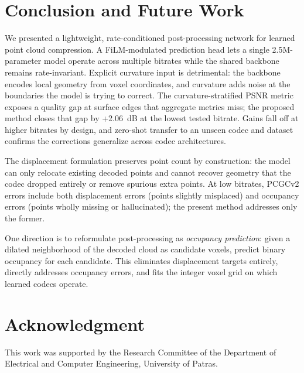\documentclass[conference]{IEEEtran}
\begin{document}
\section{Conclusion and Future Work}
\label{sec:conclusion}

We presented a lightweight, rate-conditioned post-processing network for
learned point cloud compression. A FiLM-modulated prediction head lets a
single 2.5M-parameter model operate across multiple bitrates while the shared
backbone remains rate-invariant. Explicit curvature input is detrimental:
the backbone encodes local geometry from voxel coordinates, and curvature
adds noise at the boundaries the model is trying to correct. The
curvature-stratified PSNR metric exposes a quality gap at surface edges that
aggregate metrics miss; the proposed method closes that gap by +2.06~dB at
the lowest tested bitrate. Gains fall off at higher bitrates by design, and
zero-shot transfer to an unseen codec and dataset confirms the corrections
generalize across codec architectures.

The displacement formulation preserves point count by construction: the model
can only relocate existing decoded points and cannot recover geometry that the
codec dropped entirely or remove spurious extra points. At low bitrates,
PCGCv2 errors include both displacement errors (points slightly misplaced) and
occupancy errors (points wholly missing or hallucinated); the present method
addresses only the former.

One direction is to reformulate post-processing as \emph{occupancy prediction}:
given a dilated neighborhood of the decoded cloud as candidate voxels, predict
binary occupancy for each candidate. This eliminates displacement targets
entirely, directly addresses occupancy errors, and fits the integer voxel grid
on which learned codecs operate.

\section*{Acknowledgment}
This work was supported by the Research Committee of the Department of Electrical and Computer
Engineering, University of Patras.



\end{document}
